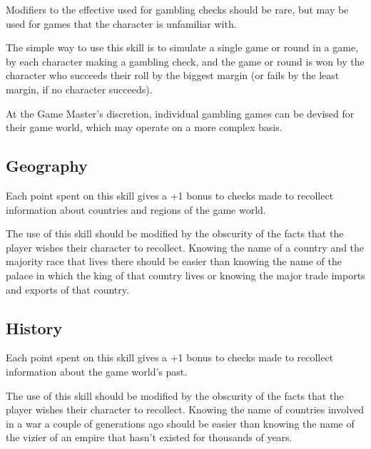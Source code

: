 \begin{multicols*}{2}
Modifiers to the effective  used for gambling checks should be rare, but may be used for games that the character is unfamiliar with.

The simple way to use this skill is to simulate a single game or round in a game, by each character making a gambling check, and the game or round is won by the character who succeeds their roll by the biggest margin (or fails by the least margin, if no character succeeds).

At the Game Master’s discretion, individual gambling games can be devised for their game world, which may operate on a more complex basis.


\subsection{Geography}\label{skill:Geography}
Each point spent on this skill gives a +1 bonus to  checks made to recollect information about countries and regions of the game world.

The use of this skill should be modified by the obscurity of the facts that the player wishes their character to recollect. Knowing the name of a country and the majority race that lives there should be easier than knowing the name of the palace in which the king of that country lives or knowing the major trade imports and exports of that country.

\subsection{History}\label{skill:History}
Each point spent on this skill gives a +1 bonus to  checks made to recollect information about the game world’s past.

The use of this skill should be modified by the obscurity of the facts that the player wishes their character to recollect. Knowing the name of countries involved in a war a couple of generations ago should be easier than knowing the name of the vizier of an empire that hasn’t existed for thousands of years.


\end{multicols*}
